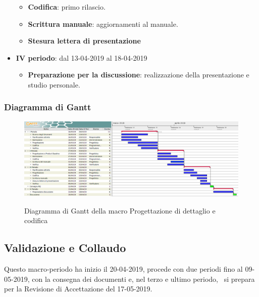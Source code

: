 \begin{itemize}
\begin{itemize}
    	        \item \textbf{Codifica}: primo rilascio.
    	        \item \textbf{Scrittura manuale}: aggiornamenti al manuale.
    	        \item \textbf{Stesura lettera di presentazione}
        	\end{itemize}
        	\item \textbf{IV periodo}: dal 13-04-2019 al 18-04-2019
			\begin{itemize}
				\item \textbf{Preparazione per la discussione}: realizzazione della presentazione e studio personale.
        	\end{itemize}
        \end{itemize}

        \begin{landscape}
			\subsubsection{Diagramma di Gantt}        
			\begin{figure}[H]
					\centering
					\includegraphics[scale=0.44]{img/Progettazione_di_dettaglio_e_codifica.png}\\
					\caption{Diagramma di Gantt della macro Progettazione di dettaglio e codifica}
			\end{figure}
		\end{landscape}
		\newpage

        \subsection{Validazione e Collaudo}
        Questo macro-periodo ha inizio il 20-04-2019, procede con due periodi fino al 09-05-2019, con la consegna dei documenti e, nel terzo e ultimo periodo, \gruppo\ si
        prepara per la Revisione di Accettazione del 17-05-2019.

